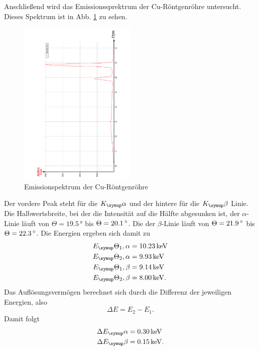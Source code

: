 Anschließend wird das Emissionssprektrum der Cu-Röntgenröhre untersucht.
Dieses Spektrum ist in Abb. \ref{fig:EmissionCu} zu sehen.
\begin{figure}
  \centering
  \includegraphics[width=0.5\textwidth, angle=270]{bilder/EmissionCu.pdf}
  \caption{Emissionspektrum der Cu-Röntgenröhre}
  \label{fig:EmissionCu}
\end{figure}
Der vordere Peak steht für die $K_\su{\alpha}$ und der hintere für die $K_\su{\beta}$
Linie. Die Halbwertsbreite, bei der die Intensität auf die Hälfte abgesunken ist,
der $\alpha$-Linie läuft von $\Theta = 19.5\,\si{\degree}$ bis $\Theta = 20.1\,\si{\degree}$.
Die der $\beta$-Linie läuft von $\Theta = 21.9\,\si{\degree}$ bis $\Theta = 22.3\,\si{\degree}$.
Die Energien ergeben sich damit zu
\begin{align}
  E_\su{\Theta_1, \alpha} &= 10.23 \keV \\
  E_\su{\Theta_2, \alpha} &= 9.93 \keV \\
  E_\su{\Theta_1, \beta} &= 9.14 \keV \\
  E_\su{\Theta_2, \beta} &= 8.00 \keV. \\
\end{align}
Das Auflösungsvermögen berechnet sich durch die Differenz der jeweiligen Energien,
also
\begin{equation}
  \Delta E = E_2 - E_1.
\end{equation}
Damit folgt
\begin{align}
  \Delta E_\su{\alpha} &= 0.30 \keV  \\
  \Delta E_\su{\beta} &= 0.15 \keV. \\
\end{align}

